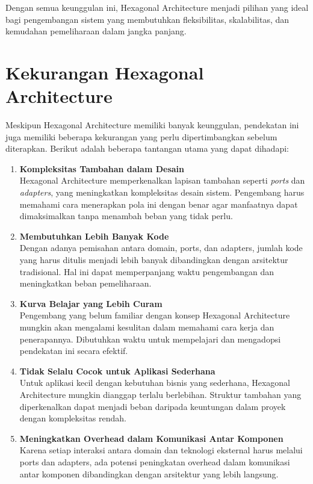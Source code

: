 Dengan semua keunggulan ini, Hexagonal Architecture menjadi pilihan yang ideal bagi pengembangan sistem yang membutuhkan fleksibilitas, skalabilitas, dan kemudahan pemeliharaan dalam jangka panjang.

\section{Kekurangan Hexagonal Architecture}

Meskipun Hexagonal Architecture memiliki banyak keunggulan, pendekatan ini juga memiliki beberapa kekurangan yang perlu dipertimbangkan sebelum diterapkan. Berikut adalah beberapa tantangan utama yang dapat dihadapi:

\begin{enumerate}
	\item \textbf{Kompleksitas Tambahan dalam Desain} \\
	Hexagonal Architecture memperkenalkan lapisan tambahan seperti \textit{ports} dan \textit{adapters}, yang meningkatkan kompleksitas desain sistem. Pengembang harus memahami cara menerapkan pola ini dengan benar agar manfaatnya dapat dimaksimalkan tanpa menambah beban yang tidak perlu.
	
	\item \textbf{Membutuhkan Lebih Banyak Kode} \\
	Dengan adanya pemisahan antara domain, ports, dan adapters, jumlah kode yang harus ditulis menjadi lebih banyak dibandingkan dengan arsitektur tradisional. Hal ini dapat memperpanjang waktu pengembangan dan meningkatkan beban pemeliharaan.
	
	\item \textbf{Kurva Belajar yang Lebih Curam} \\
	Pengembang yang belum familiar dengan konsep Hexagonal Architecture mungkin akan mengalami kesulitan dalam memahami cara kerja dan penerapannya. Dibutuhkan waktu untuk mempelajari dan mengadopsi pendekatan ini secara efektif.
	
	\item \textbf{Tidak Selalu Cocok untuk Aplikasi Sederhana} \\
	Untuk aplikasi kecil dengan kebutuhan bisnis yang sederhana, Hexagonal Architecture mungkin dianggap terlalu berlebihan. Struktur tambahan yang diperkenalkan dapat menjadi beban daripada keuntungan dalam proyek dengan kompleksitas rendah.
	
	\item \textbf{Meningkatkan Overhead dalam Komunikasi Antar Komponen} \\
	Karena setiap interaksi antara domain dan teknologi eksternal harus melalui ports dan adapters, ada potensi peningkatan overhead dalam komunikasi antar komponen dibandingkan dengan arsitektur yang lebih langsung.
\end{enumerate}

